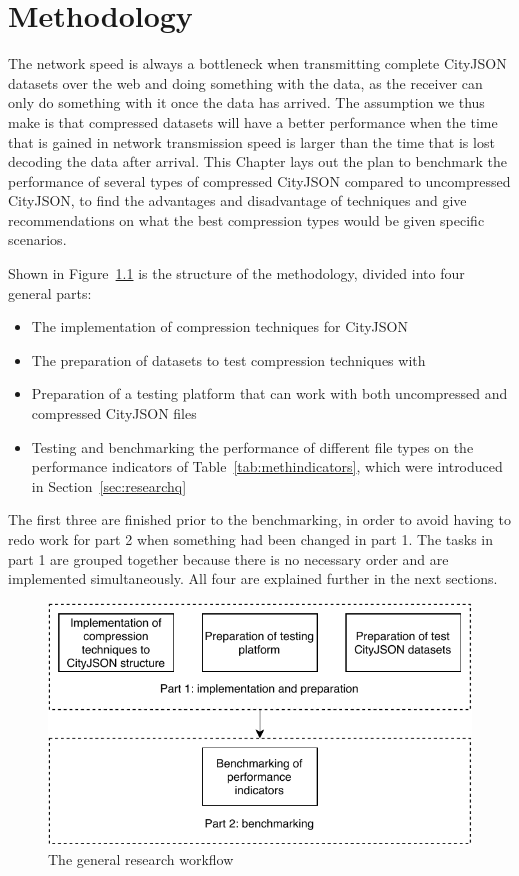 \chapter{Methodology}
\label{ch:meth}


The network speed is always a bottleneck when transmitting complete CityJSON datasets over the web and doing something with the data, as the receiver can only do something with it once the data has arrived.
The assumption we thus make is that compressed datasets will have a better performance when the time that is gained in network transmission speed is larger than the time that is lost decoding the data after arrival.
This Chapter lays out the plan to benchmark the performance of several types of compressed CityJSON compared to uncompressed CityJSON, to find the advantages and disadvantage of techniques and give recommendations on what the best compression types would be given specific scenarios.

Shown in Figure~\ref{fig:workflow} is the structure of the methodology, divided into four general parts:
\begin{itemize}
\item The implementation of compression techniques for CityJSON
\item The preparation of datasets to test compression techniques with
\item Preparation of a testing platform that can work with both uncompressed and compressed CityJSON files
\item Testing and benchmarking the performance of different file types on the performance indicators of Table~\ref{tab:methindicators}, which were introduced in Section~\ref{sec:researchq}
\end{itemize}

The first three are finished prior to the benchmarking, in order to avoid having to redo work for part 2 when something had been changed in part 1.
The tasks in part 1 are grouped together because there is no necessary order and are implemented simultaneously.
All four are explained further in the next sections.

\begin{figure}[h!]
    \centering
    \includegraphics[scale=1]{figs/methodology/methodology_flow2.pdf}
    \caption{The general research workflow}
    \label{fig:workflow}
\end{figure}

